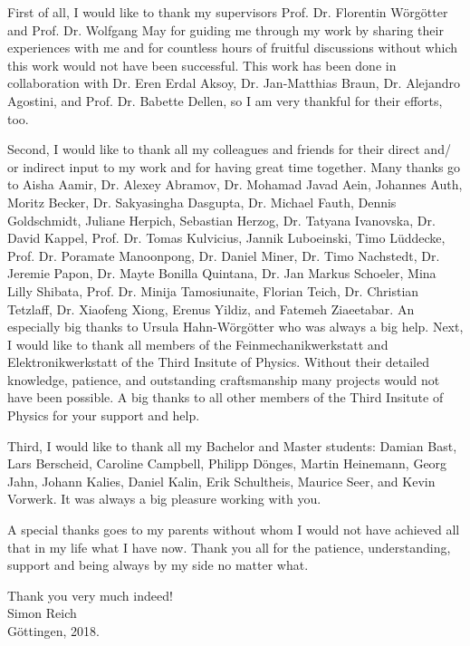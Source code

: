 First of all, I would like to thank my supervisors Prof. Dr. Florentin W\"org\"otter and Prof. Dr. Wolfgang May for guiding me through my work by sharing their experiences with me and for countless hours of fruitful discussions without which this work would not have been successful. 
This work has been done in collaboration with Dr. Eren Erdal Aksoy, Dr. Jan-Matthias Braun, Dr. Alejandro Agostini, and Prof. Dr. Babette Dellen, so I am very thankful for their efforts, too.

Second, I would like to thank all my colleagues and friends for their direct and/ or indirect input to my work and for having great time together. 
Many thanks go to Aisha Aamir, Dr. Alexey Abramov, Dr. Mohamad Javad Aein, Johannes Auth, Moritz Becker, Dr. Sakyasingha Dasgupta, Dr. Michael Fauth, Dennis Goldschmidt, Juliane Herpich, Sebastian Herzog, Dr. Tatyana Ivanovska, Dr. David Kappel, Prof. Dr. Tomas Kulvicius, Jannik Luboeinski, Timo Lüddecke, Prof. Dr. Poramate Manoonpong, Dr. Daniel Miner, Dr. Timo Nachstedt, Dr. Jeremie Papon, Dr. Mayte Bonilla Quintana, Dr. Jan Markus Schoeler, Mina Lilly Shibata, Prof. Dr. Minija Tamosiunaite, Florian Teich, Dr. Christian Tetzlaff, Dr. Xiaofeng Xiong, Erenus Yildiz, and Fatemeh Ziaeetabar.
An especially big thanks to Ursula Hahn-W\"org\"otter who was always a big help.
Next, I would like to thank all members of the Feinmechanikwerkstatt and Elektronikwerkstatt of the Third Insitute of Physics.
Without their detailed knowledge, patience, and outstanding craftsmanship many projects would not have been possible.
A big thanks to all other members of the Third Insitute of Physics for your support and help.

Third, I would like to thank all my Bachelor and Master students: Dami\-an Bast, Lars Berscheid, Caroline Campbell, Philipp D\"onges, Martin Hei\-ne\-mann, Georg Jahn, Johann Kalies, Daniel Kalin, Erik Schultheis, Maurice Seer, and Kevin Vorwerk.
It was always a big pleasure working with you.

A special thanks goes to my parents without whom I would not have achieved all that in my life what I have now. 
Thank you all for the patience, understanding, support and being always by my side no matter what.

Thank you very much indeed!
\vspace{1cm}\\
Simon Reich\\G\"ottingen, 2018.
